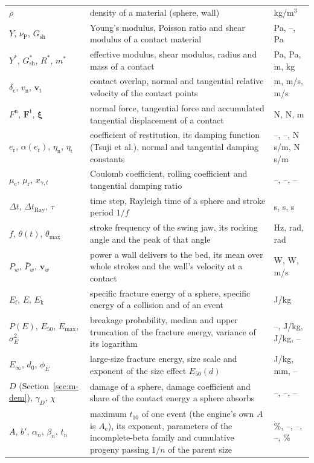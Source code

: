 \begin{longtable}{@{}p{} p{} p{}@{}}
$\rho$ & density of a material (sphere, wall) & kg/m$^3$ \\
$Y$, $\nu_{\mathrm P}$, $G_{\mathrm{sh}}$ & Young's modulus, Poisson ratio and shear modulus of a contact material & Pa, --, Pa \\
$Y^{\ast}$, $G^{\ast}_{\mathrm{sh}}$, $R^{\ast}$, $m^{\ast}$ & effective modulus, shear modulus, radius and mass of a contact & Pa, Pa, m, kg \\
$\delta_{\mathrm c}$, $v_{\mathrm n}$, $\mathbf v_{\mathrm t}$ & contact overlap, normal and tangential relative velocity of the contact points & m, m/s, m/s \\
$F^{\mathrm n}$, $\mathbf F^{\mathrm t}$, $\boldsymbol\xi$ & normal force, tangential force and accumulated tangential displacement of a contact & N, N, m \\
$e_{\mathrm r}$, $\alpha(e_{\mathrm r})$, $\eta_{\mathrm n}$, $\eta_{\mathrm t}$ & coefficient of restitution, its damping function (Tsuji et al.), normal and tangential damping constants & --, --, N\,s/m, N\,s/m \\
$\mu_{\mathrm c}$, $\mu_{\mathrm r}$, $x_{\gamma,t}$ & Coulomb coefficient, rolling coefficient and tangential damping ratio & --, --, -- \\
$\Delta t$, $\Delta t_{\mathrm{Ray}}$, $\tau$ & time step, Rayleigh time of a sphere and stroke period $1/f$ & s, s, s \\
$f$, $\theta(t)$, $\theta_{\max}$ & stroke frequency of the swing jaw, its rocking angle and the peak of that angle & Hz, rad, rad \\
$P_w$, $\bar P_w$, $\mathbf v_w$ & power a wall delivers to the bed, its mean over whole strokes and the wall's velocity at a contact & W, W, m/s \\
$E_{\mathrm f}$, $E$, $E_{\mathrm k}$ & specific fracture energy of a sphere, specific energy of a collision and of an event & J/kg \\
$P(E)$, $E_{50}$, $E_{\max}$, $\sigma_E^2$ & breakage probability, median and upper truncation of the fracture energy, variance of its logarithm & --, J/kg, J/kg, -- \\
$E_{\infty}$, $d_0$, $\phi_E$ & large-size fracture energy, size scale and exponent of the size effect $E_{50}(d)$ & J/kg, mm, -- \\
$D$ (Section~\ref{sec:m-dem}), $\gamma_D$, $\chi$ & damage of a sphere, damage coefficient and share of the contact energy a sphere absorbs & --, --, -- \\
$A$, $b'$, $\alpha_n$, $\beta_n$, $t_n$ & maximum $t_{10}$ of one event (the engine's own $A$ is $A_{\mathrm e}$), its exponent, parameters of the incomplete-beta family and cumulative progeny passing $1/n$ of the parent size & \%, --, --, --, \% \\

\end{longtable}

